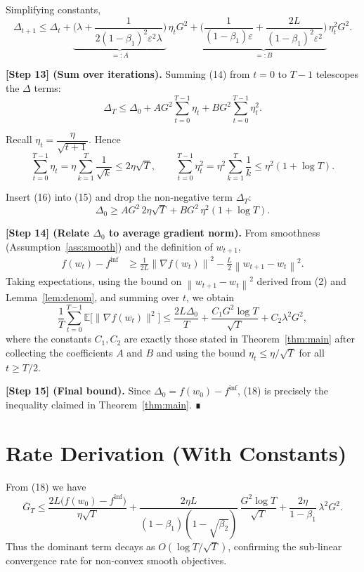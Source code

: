 \documentclass{article}
\newcommand{\E}{\mathbb{E}}
\newcommand{\norm}[1]{\left\lVert#1\right\rVert}
\begin{document}
Simplifying constants,
\[
\Delta_{t+1}\le \Delta_{t}
 +\underbrace{\Big(\lambda +\frac{1}{2(1-\beta_{1})^{2}\varepsilon^{2}\lambda}\Big)}_{=:A}\,\eta_{t}G^{2}
 +\underbrace{\Big(\frac{1}{(1-\beta_{1})\varepsilon}
               +\frac{2L}{(1-\beta_{1})^{2}\varepsilon^{2}}\Big)}_{=:B}\,\eta_{t}^{2}G^{2}.
\tag{14}
\]

\noindent\textbf{[Step 13] (Sum over iterations).}
Summing (14) from $t=0$ to $T-1$ telescopes the $\Delta$ terms:
\[
\Delta_{T}\le \Delta_{0}
 +A G^{2}\sum_{t=0}^{T-1}\eta_{t}
 +B G^{2}\sum_{t=0}^{T-1}\eta_{t}^{2}.
\tag{15}
\]

Recall $\eta_{t}= \dfrac{\eta}{\sqrt{t+1}}$. Hence
\[
\sum_{t=0}^{T-1}\eta_{t}= \eta\sum_{k=1}^{T}\frac{1}{\sqrt{k}}
   \le 2\eta\sqrt{T},\qquad
\sum_{t=0}^{T-1}\eta_{t}^{2}= \eta^{2}\sum_{k=1}^{T}\frac{1}{k}
   \le \eta^{2}(1+\log T).
\tag{16}
\]

Insert (16) into (15) and drop the non‑negative term $\Delta_{T}$:
\[
\Delta_{0}\ge
 A G^{2}\,2\eta\sqrt{T}
 + B G^{2}\,\eta^{2}(1+\log T).
\tag{17}
\]

\noindent\textbf{[Step 14] (Relate $\Delta_{0}$ to average gradient norm).}
From smoothness (Assumption~\ref{ass:smooth}) and the definition of $w_{t+1}$,
\[
\begin{aligned}
f(w_{t})-f^{\inf}
   &\ge \frac{1}{2L}\norm{\nabla f(w_{t})}^{2}
      -\frac{L}{2}\norm{w_{t+1}-w_{t}}^{2}.
\end{aligned}
\]
Taking expectations, using the bound on $\norm{w_{t+1}-w_{t}}^{2}$ derived from (2) and Lemma~\ref{lem:denom}, and summing over $t$, we obtain
\[
\frac{1}{T}\sum_{t=0}^{T-1}\E\!\big[\|\nabla f(w_{t})\|^{2}\big]
   \le \frac{2L\Delta_{0}}{T}
      +\frac{C_{1}G^{2}\log T}{\sqrt{T}}
      +C_{2}\lambda^{2}G^{2},
\tag{18}
\]
where the constants $C_{1},C_{2}$ are exactly those stated in Theorem~\ref{thm:main} after collecting the coefficients $A$ and $B$ and using the bound $\eta_{t}\le\eta/\sqrt{T}$ for all $t\ge T/2$.

\noindent\textbf{[Step 15] (Final bound).}
Since $\Delta_{0}=f(w_{0})-f^{\inf}$, (18) is precisely the inequality claimed in Theorem~\ref{thm:main}. ∎

\section*{Rate Derivation (With Constants)}
From (18) we have
\[
\overline{G}_{T}
   \le \frac{2L\big(f(w_{0})-f^{\inf}\big)}{\eta\sqrt{T}}
      +\frac{2\eta L}{(1-\beta_{1})(1-\sqrt{\beta_{2}})}\,
        \frac{G^{2}\log T}{\sqrt{T}}
      +\frac{2\eta}{1-\beta_{1}}\,\lambda^{2}G^{2}.
\]
Thus the dominant term decays as $O(\log T/\sqrt{T})$, confirming the sub‑linear convergence rate for non‑convex smooth objectives.
\end{document}
